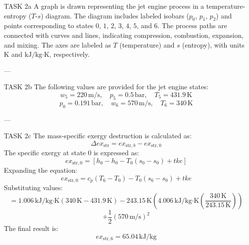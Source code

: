 TASK 2a  
A graph is drawn representing the jet engine process in a temperature-entropy (\( T \)-\( s \)) diagram. The diagram includes labeled isobars (\( p_0 \), \( p_1 \), \( p_2 \)) and points corresponding to states \( 0 \), \( 1 \), \( 2 \), \( 3 \), \( 4 \), \( 5 \), and \( 6 \). The process paths are connected with curves and lines, indicating compression, combustion, expansion, and mixing. The axes are labeled as \( T \) (temperature) and \( s \) (entropy), with units \( \text{K} \) and \( \text{kJ/kg·K} \), respectively.  

---

TASK 2b  
The following values are provided for the jet engine states:  
\[
w_5 = 220 \, \text{m/s}, \quad p_5 = 0.5 \, \text{bar}, \quad T_5 = 431.9 \, \text{K}
\]
\[
p_0 = 0.191 \, \text{bar}, \quad w_6 = 570 \, \text{m/s}, \quad T_6 = 340 \, \text{K}
\]

---

TASK 2c  
The mass-specific exergy destruction is calculated as:  
\[
\Delta ex_{\text{str}} = ex_{\text{str},b} - ex_{\text{str},0}
\]
The specific exergy at state \( 0 \) is expressed as:  
\[
ex_{\text{str},0} = [h_0 - h_0 - T_0(s_0 - s_0) + tke]
\]
Expanding the equation:  
\[
ex_{\text{str},0} = c_p \left( T_6 - T_0 \right) - T_0 \left( s_6 - s_0 \right) + tke
\]
Substituting values:  
\[
= 1.006 \, \text{kJ/kg·K} \left( 340 \, \text{K} - 431.9 \, \text{K} \right) - 243.15 \, \text{K} \left( 4.006 \, \text{kJ/kg·K} \left( \frac{340 \, \text{K}}{243.15 \, \text{K}} \right) \right)
\]
\[
+ \frac{1}{2} \left( 570 \, \text{m/s} \right)^2
\]
The final result is:  
\[
ex_{\text{str},6} = 65.04 \, \text{kJ/kg}
\]